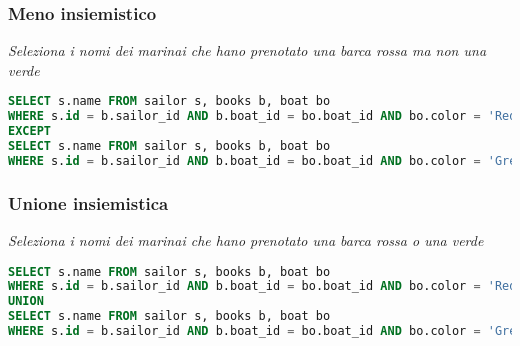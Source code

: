 \subsubsection*{Meno insiemistico}
\begin{center}
	\textit{Seleziona i nomi dei marinai che hano prenotato una barca rossa ma non una verde}
\end{center}
\begin{lstlisting}[language = SQL, style = SQL, frame = none] 
SELECT s.name FROM sailor s, books b, boat bo
WHERE s.id = b.sailor_id AND b.boat_id = bo.boat_id AND bo.color = 'Red' 
EXCEPT 
SELECT s.name FROM sailor s, books b, boat bo
WHERE s.id = b.sailor_id AND b.boat_id = bo.boat_id AND bo.color = 'Green';
\end{lstlisting}

\subsubsection*{Unione insiemistica}
\begin{center}
	\textit{Seleziona i nomi dei marinai che hano prenotato una barca rossa o una verde}

\end{center}
\begin{lstlisting}[language = SQL, style = SQL, frame = none] 
SELECT s.name FROM sailor s, books b, boat bo
WHERE s.id = b.sailor_id AND b.boat_id = bo.boat_id AND bo.color = 'Red' 
UNION
SELECT s.name FROM sailor s, books b, boat bo
WHERE s.id = b.sailor_id AND b.boat_id = bo.boat_id AND bo.color = 'Green';
\end{lstlisting}

